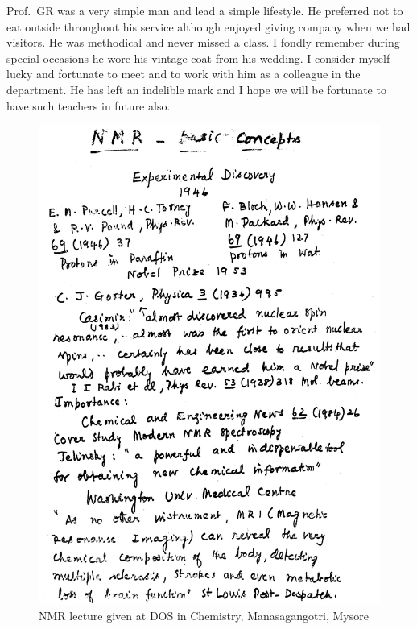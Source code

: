 Prof.\ GR was a very simple man and lead a simple lifestyle. He preferred not to eat outside throughout his
service although enjoyed giving company when we had visitors. He was methodical and never missed a class. I
fondly remember during special occasions he wore his vintage coat from his wedding. I consider myself lucky and
fortunate to meet and to work with him as a colleague in the department. He has left an indelible mark and I
hope we will be fortunate to have such teachers in future also.
\begin{figure}[H]
\centering
\includegraphics[scale=0.61]{src/images/chap8/1.eps}
\caption{NMR lecture given at DOS in Chemistry, Manasagangotri, Mysore}
\end{figure}
